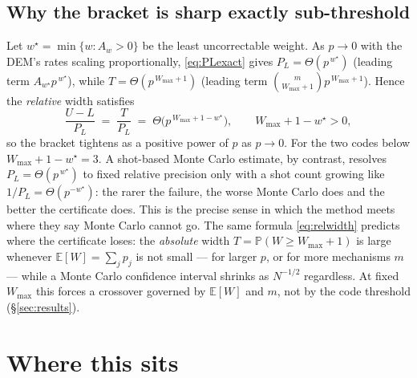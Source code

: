 \documentclass[11pt]{amsart}
\newcommand{\PL}{P_{L}}
\newcommand{\WMAX}{W_{\max}}
\newcommand{\Prb}{\mathbb{P}}
\newcommand{\Ex}{\mathbb{E}}
\theoremstyle{plain}
\theoremstyle{definition}
\theoremstyle{remark}
\begin{document}
\subsection{Why the bracket is sharp exactly sub-threshold}\label{ssec:scaling}
Let $w^\star=\min\{w:A_w>0\}$ be the least uncorrectable weight. As $p\to0$
with the DEM's rates scaling proportionally, \eqref{eq:PLexact} gives
$\PL=\Theta(p^{\,w^\star})$ (leading term $A_{w^\star}p^{\,w^\star}$), while
$T=\Theta(p^{\,\WMAX+1})$ (leading term $\binom{m}{\WMAX+1}p^{\,\WMAX+1}$).
Hence the \emph{relative} width satisfies
\begin{equation}\label{eq:relwidth}
   \frac{U-L}{\PL}\;=\;\frac{T}{\PL}\;=\;\Theta\!\bigl(p^{\,\WMAX+1-w^\star}\bigr),
   \qquad \WMAX+1-w^\star>0,
\end{equation}
so the bracket tightens as a positive power of $p$ as $p\to0$. For the two
codes below $\WMAX+1-w^\star=3$. A shot-based Monte Carlo estimate, by
contrast, resolves $\PL=\Theta(p^{\,w^\star})$ to fixed relative precision only
with a shot count growing like $1/\PL=\Theta(p^{-w^\star})$: the rarer the
failure, the worse Monte Carlo does and the better the certificate does. This
is the precise sense in which the method meets \cite{MWB} where they say Monte
Carlo cannot go. The same formula \eqref{eq:relwidth} predicts where the
certificate loses: the \emph{absolute} width $T=\Prb(W\ge\WMAX+1)$ is large
whenever $\Ex[W]=\sum_j p_j$ is not small --- for larger $p$, or for more
mechanisms $m$ --- while a Monte Carlo confidence interval shrinks as
$N^{-1/2}$ regardless. At fixed $\WMAX$ this forces a crossover governed by
$\Ex[W]$ and $m$, not by the code threshold (\S\ref{sec:results}).

\section{Where this sits}\label{sec:priorart}
\end{document}
